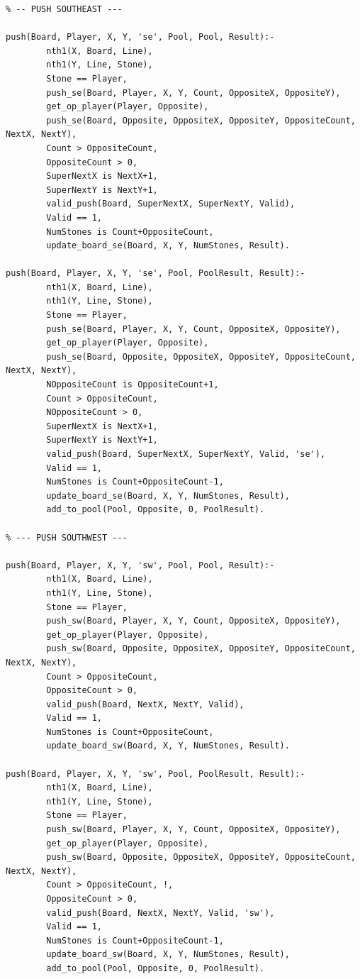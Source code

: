 \documentclass[a4paper]{article}
\begin{document}
\begin{lstlisting}
% -- PUSH SOUTHEAST ---

push(Board, Player, X, Y, 'se', Pool, Pool, Result):- 
        nth1(X, Board, Line),
        nth1(Y, Line, Stone),
        Stone == Player,
        push_se(Board, Player, X, Y, Count, OppositeX, OppositeY),
        get_op_player(Player, Opposite),
        push_se(Board, Opposite, OppositeX, OppositeY, OppositeCount, NextX, NextY),
        Count > OppositeCount,
        OppositeCount > 0,
        SuperNextX is NextX+1,
        SuperNextY is NextY+1,
        valid_push(Board, SuperNextX, SuperNextY, Valid),
        Valid == 1,
        NumStones is Count+OppositeCount,
        update_board_se(Board, X, Y, NumStones, Result).

push(Board, Player, X, Y, 'se', Pool, PoolResult, Result):- 
        nth1(X, Board, Line),
        nth1(Y, Line, Stone),
        Stone == Player,
        push_se(Board, Player, X, Y, Count, OppositeX, OppositeY),
        get_op_player(Player, Opposite),
        push_se(Board, Opposite, OppositeX, OppositeY, OppositeCount, NextX, NextY),
        NOppositeCount is OppositeCount+1,
        Count > OppositeCount,
        NOppositeCount > 0,
        SuperNextX is NextX+1,
        SuperNextY is NextY+1,
        valid_push(Board, SuperNextX, SuperNextY, Valid, 'se'),
        Valid == 1,
        NumStones is Count+OppositeCount-1,
        update_board_se(Board, X, Y, NumStones, Result),
        add_to_pool(Pool, Opposite, 0, PoolResult).

% --- PUSH SOUTHWEST ---

push(Board, Player, X, Y, 'sw', Pool, Pool, Result):- 
        nth1(X, Board, Line),
        nth1(Y, Line, Stone),
        Stone == Player,
        push_sw(Board, Player, X, Y, Count, OppositeX, OppositeY),
        get_op_player(Player, Opposite),
        push_sw(Board, Opposite, OppositeX, OppositeY, OppositeCount, NextX, NextY),
        Count > OppositeCount,
        OppositeCount > 0,
        valid_push(Board, NextX, NextY, Valid),
        Valid == 1,
        NumStones is Count+OppositeCount,
        update_board_sw(Board, X, Y, NumStones, Result).

push(Board, Player, X, Y, 'sw', Pool, PoolResult, Result):- 
        nth1(X, Board, Line),
        nth1(Y, Line, Stone),
        Stone == Player,
        push_sw(Board, Player, X, Y, Count, OppositeX, OppositeY),
        get_op_player(Player, Opposite),
        push_sw(Board, Opposite, OppositeX, OppositeY, OppositeCount, NextX, NextY),
        Count > OppositeCount, !,
        OppositeCount > 0,
        valid_push(Board, NextX, NextY, Valid, 'sw'),
        Valid == 1,
        NumStones is Count+OppositeCount-1,
        update_board_sw(Board, X, Y, NumStones, Result),
        add_to_pool(Pool, Opposite, 0, PoolResult).


\end{lstlisting}
\end{document}
